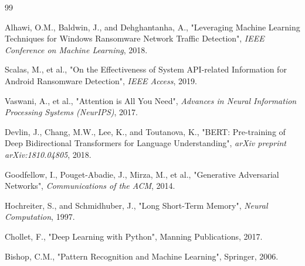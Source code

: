 \documentclass[12pt]{report}
\begin{document}
\begin{thebibliography}{99}

 Alhawi, O.M., Baldwin, J., and Dehghantanha, A., "Leveraging Machine Learning Techniques for Windows Ransomware Network Traffic Detection", \textit{IEEE Conference on Machine Learning}, 2018.

 Scalas, M., et al., "On the Effectiveness of System API-related Information for Android Ransomware Detection", \textit{IEEE Access}, 2019.

 Vaswani, A., et al., "Attention is All You Need", \textit{Advances in Neural Information Processing Systems (NeurIPS)}, 2017.

 Devlin, J., Chang, M.W., Lee, K., and Toutanova, K., "BERT: Pre-training of Deep Bidirectional Transformers for Language Understanding", \textit{arXiv preprint arXiv:1810.04805}, 2018.

 Goodfellow, I., Pouget-Abadie, J., Mirza, M., et al., "Generative Adversarial Networks", \textit{Communications of the ACM}, 2014.

 Hochreiter, S., and Schmidhuber, J., "Long Short-Term Memory", \textit{Neural Computation}, 1997.

 Chollet, F., "Deep Learning with Python", Manning Publications, 2017.

 Bishop, C.M., "Pattern Recognition and Machine Learning", Springer, 2006.


\end{thebibliography}
\end{document}
